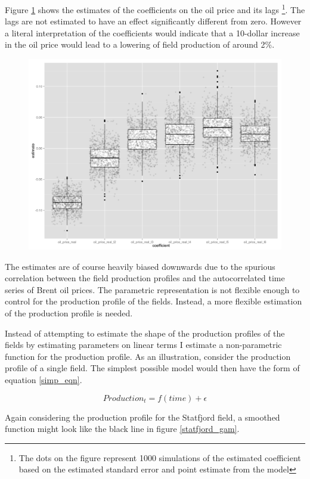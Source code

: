 \documentclass[12pt]{scrartcl} %
\begin{document}
Figure \ref{glm_dirty_box} shows the estimates of the coefficients on the oil price and its lags \footnote{The dots on the figure represent 1000 simulations of the estimated coefficient based on the estimated standard error and point estimate from the model}.  The lags are not estimated to have an effect significantly different from zero. However a literal interpretation of the coefficients would indicate that a 10-dollar increase in the oil price would lead to a lowering of field production of around 2\%.

\begin{figure}
\includegraphics[width=.8\textwidth]{glm_dirty_box.png}
\caption{}
\label{glm_dirty_box}
\end{figure}

The estimates are of course heavily biased downwards due to the spurious correlation between the field production profiles and the autocorrelated time series of Brent oil prices.  The parametric representation is not flexible enough to control for the production profile of the fields.  Instead, a more flexible estimation of the production profile is needed. 

Instead of attempting to estimate the shape of the production profiles of the fields by estimating parameters on linear terms I estimate a non-parametric function for the production profile.  As an illustration, consider the production profile of a single field.  The simplest possible model would then have the form of equation \ref{simp_eqn}. 

\begin{equation}
Production_{t}=f(time) + \epsilon
	\label{simp_eqn}
\end{equation}

Again considering the production profile for the Statfjord field, a smoothed function might look like the black line in figure \ref{statfjord_gam}.   
\end{document}

